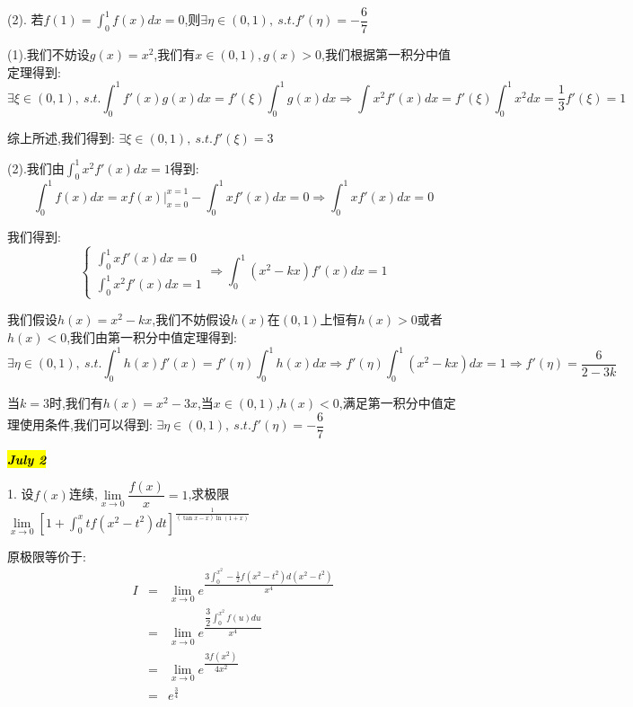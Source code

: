 (2). 若$f(1)=\int_{0}^{1}f(x)dx=0$,则$\exists \eta\in(0,1), \ s.t. f'(\eta)=-\dfrac{6}{7}$
\begin{solution}
	
	(1).我们不妨设$g(x)=x^2$,我们有$x\in(0,1),g(x)>0$,我们根据第一积分中值定理得到: 
	$$\exists\xi\in(0,1),\ s.t. \int_{0}^{1}f'(x)g(x)dx=f'(\xi)\int_{0}^{1}g(x)dx\Rightarrow \int_{}^{}x^2f'(x)dx=f'(\xi)\int_{0}^{1}x^2dx=\dfrac{1}{3}f'(\xi)=1$$
	
	综上所述,我们得到: $\exists \xi\in(0,1),\ s.t. f'(\xi)=3$
	
	(2).我们由$\int_{0}^{1}x^2f'(x)dx=1$得到: 
	$$\int_{0}^{1}f(x)dx=xf(x)|_{x=0}^{x=1}-\int_{0}^{1}xf'(x)dx=0\Rightarrow \int_{0}^{1}xf'(x)dx=0$$
	
	我们得到: 
	$$\left\lbrace
	\begin{array}{l}
		\int_{0}^{1}xf'(x)dx=0\\
		\int_{0}^{1}x^2f'(x)dx=1
	\end{array}
	\right. \Rightarrow \int_{0}^{1}(x^2-kx)f'(x)dx=1$$
	
	我们假设$h(x)=x^2-kx$,我们不妨假设$h(x)$在$(0,1)$上恒有$h(x)>0$或者$h(x)<0$,我们由第一积分中值定理得到: 
	$$\exists\eta\in(0,1),\ s.t. \int_{0}^{1}h(x)f'(x)=f'(\eta)\int_{0}^{1}h(x)dx\Rightarrow f'(\eta)\int_{0}^{1}(x^2-kx)dx=1\Rightarrow f'(\eta)=\dfrac{6}{2-3k}$$
	
	当$k=3$时,我们有$h(x)=x^2-3x$,当$x\in(0,1)$,$h(x)<0$,满足第一积分中值定理使用条件,我们可以得到: $\exists \eta\in(0,1), \ s.t. f'(\eta)=-\dfrac{6}{7}$
\end{solution}

\hl{\textbf{\textit{July 2}}}

1. 设$f(x)$连续,$\lim\limits_{x\rightarrow 0}\dfrac{f(x)}{x}=1$,求极限$\lim\limits_{x\rightarrow 0 }\left[ 1+\int_{0}^{x}tf(x^2-t^2)dt\right]^{\frac{1}{(\tan x-x)\ln(1+x)}} $
\begin{solution}
	
	原极限等价于: 
	\begin{eqnarray*}
		I&=&\lim\limits_{x\rightarrow 0}e^{\dfrac{3\int_{0}^{x^2}-\frac{1}{2}f(x^2-t^2)d(x^2-t^2)}{x^4}}\\
		&=&\lim\limits_{x\rightarrow 0}e^{\dfrac{\dfrac{3}{2}\int_{0}^{x^2}f(u)du}{x^4}}\\
		&=&\lim\limits_{x\rightarrow 0}e^{\dfrac{3f(x^2)}{4x^2}}\\
		&=&e^{\frac{3}{4}}
	\end{eqnarray*}
\end{solution}

